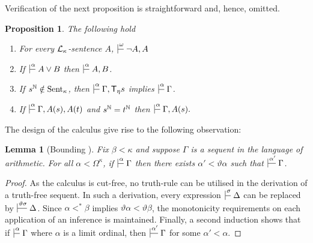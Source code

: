 \documentclass[UKenglish,cleveref,DIV=12]{scrartcl}
\newtheorem{lemma}[theorem]{Lemma}%
\newtheorem{proposition}[lemma]{Proposition}
\theoremstyle{definition}
\theoremstyle{definition}
\begin{document}
Verification of the next proposition is straightforward and, hence, omitted.
\begin{proposition}\label{inf-props} The following hold
 \begin{enumerate}
	\item For every \( \mathcal{L}_\kappa \)-sentence \( A \), \( \prov{\omega} {\lnot A,A} \)
	\item If \( \prov \alpha A \vee B \) then \( \prov\alpha A , B \).
  \item If $s^{\mathbb N} \notin \mathrm{Sent}_\kappa$, then $\prov{\alpha}{\Gamma, \T_\eta s}$ implies $\prov{\alpha}{\Gamma}$.\label{lem:F8L1itemviji}
  \item If\/ $\prov{\alpha}{\Gamma, A(s), A(t)}$ and
	$s^{\mathbb N}=t^{\mathbb N}$ then
	$\prov{\alpha}{\Gamma, A(s).}$\label{lem:F8L1itemx}
\end{enumerate}
\end{proposition}

The design of the calculus give rise to the following observation:
\begin{lemma}[Bounding ]\label{bounding}
	Fix \( \beta < \kappa \) and suppose \( \Gamma \) is a sequent in the language of arithmetic.
	For all \( \alpha < \Omega^\kappa \), if \( \prov{\alpha} \Gamma \) then there exists \( \alpha' <  \vartheta\alpha \) such that \( \prov{\alpha'} \Gamma \).
\end{lemma}
\begin{proof}
	As the calculus is cut-free, no truth-rule can be utilised in the derivation of a truth-free sequent.
	In such a derivation, every expression \( \prov \sigma \Delta \) can be replaced by \( \prov{\vartheta\sigma} \Delta \).
	Since \( \alpha <^* \beta \) implies \( \vartheta \alpha < \vartheta \beta \), the monotonicity requirements on each application of an inference is maintained.
	Finally, a second induction shows that if \( \prov \alpha \Gamma \) where \( \alpha \) is a limit ordinal, then \( \prov{\alpha'} \Gamma \) for some \( \alpha' < \alpha \).
\end{proof}
\end{document}
